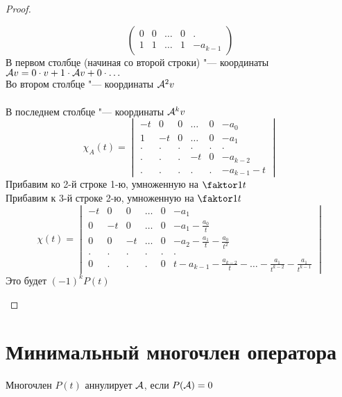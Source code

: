 \begin{proof}
\begin{itemize}
$$\begin{pmatrix}
            0 & 0 & \dots & 0 & . \\
            1 & 1 & \dots & 1 & -a_{k - 1}
        \end{pmatrix} $$
        В первом столбце (начиная со второй строки) "--- координаты $ \mathcal{A}v = 0 \cdot v + 1 \cdot \mathcal{A}v + 0 \cdot \dots $ \\
        Во втором столбце "--- координаты $ \mathcal{A}^2v $ \\
        \widedots[10em] \\
        В последнем столбце "--- координаты $ \mathcal{A}^kv $
        $$ \chi_A(t) =
        \begin{vmatrix}
            -t & 0 & 0 & \dots & 0 & -a_0 \\
            1 & -t & 0 & \dots & 0 & -a_1 \\
            . & . & . & . & . & . \\
            . & . & . & -t & 0 & -a_{k - 2} \\
            . & . & . & . & . & -a_{k - 1} - t
        \end{vmatrix} $$
        Прибавим ко 2-й строке 1-ю, умноженную на $ \faktor1t $ \\
        Прибавим к 3-й строке 2-ю, умноженную на $ \faktor1t $
        \widedots[10em]
        $$ \chi(t) =
        \begin{vmatrix}
            -t & 0 & 0 & \dots & 0 & -a_1 \\
            0 & -t & 0 & \dots & 0 & -a_1 - \frac{a_0}t \\
            0 & 0 & -t & \dots & 0 & -a_2 - \frac{a_1}t - \frac{a_0}{t^2} \\
            . & . & . & . & . & . \\
            0 & . & . & . & 0 & t - a_{k - 1} - \frac{a_{k -2}}t - \dots - \frac{a_1}{t^{k - 2}} - \frac{a_1}{t^{k - 1}}
        \end{vmatrix} $$
        Это будет $ (-1)^kP(t) $
    \end{itemize}
\end{proof}

\section{Минимальный многочлен оператора}

\begin{definition}
	Многочлен $ P(t) $ аннулирует $ \mathcal{A} $, если $ P(\mathcal{A}) = 0 $
\end{definition}

